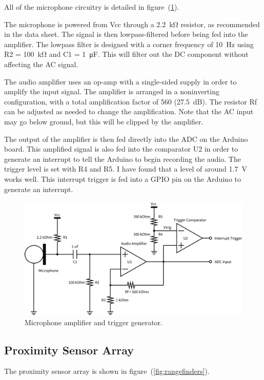 \documentclass[11pt]{article}
\begin{document}
All of the microphone circuitry is detailed in figure~(\ref{fig:microphone}).

The microphone is powered from Vcc through a \SI{2.2}{\kilo\ohm} resistor,
as recommended in the data sheet. The signal is then lowpass-filtered before
being fed into the amplifier. The lowpass filter is designed with a corner
frequency of \SI{10}{\hertz} using R2 = \SI{100}{\kilo\ohm} and C1 =
\SI{1}{\micro\farad}. This will filter out the DC component without affecting
the AC signal.

The audio amplifier uses an op-amp with a single-sided supply in order to
amplify the input signal. The amplifier is arranged in a noninverting
configuration, with a total amplification factor of 560 (\SI{27.5}{\deci\bel}).
The resistor Rf can be adjusted as needed to change the amplification. Note
that the AC input may go below ground, but this will be clipped by the
amplifier.

The output of the amplifier is then fed directly into the ADC on the Arduino
board. This amplified signal is also fed into the comparator U2 in order to
generate an interrupt to tell the Arduino to begin recording the audio. The
trigger level is set with R4 and R5. I have found that a level of around
\SI{1.7}{\volt} works well. This interrupt trigger is fed into a GPIO pin on the
Arduino to generate an interrupt.

\begin{figure}[h]
    \centering
    \includegraphics[width=0.8\linewidth]{sch/microphone.png}
    \caption{Microphone amplifier and trigger generator.}
\label{fig:microphone}
\end{figure}

\subsection{Proximity Sensor Array}
\label{sub:proximity_sensor_array}

The proximity sensor array is shown in figure~(\ref{fig:rangefinders}).
\end{document}
